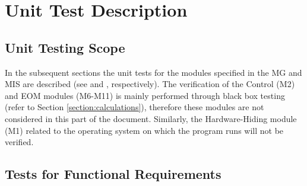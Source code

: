 \documentclass[12pt, titlepage]{article}
\begin{document}
\section{Unit Test Description}
\label{section:unittest}

\subsection{Unit Testing Scope}
\label{sec:unitscope}

In the subsequent sections the unit tests for the modules specified in the MG 
and MIS are described (see \cite{MG2020} and \cite{MIS2020}, respectively). The 
verification of the Control (M2) and EOM modules (M6-M11) is mainly performed 
through black box testing (refer to Section \ref{section:calculations}), 
therefore these modules are not considered in this part of the document. 
Similarly, the Hardware-Hiding module (M1) related to the operating system on 
which the program runs will not be verified.

\subsection{Tests for Functional Requirements}


%
%
%
%
%					
%					
%					
%
%
%					
%
%					
%					
%					
%
%
%
%    
\end{document}
